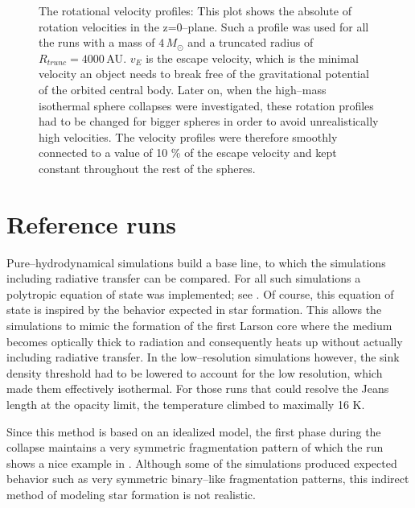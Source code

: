 \begin{figure}[!htb]
\captionsetup{justification=justified,singlelinecheck=false,width=\linewidth}
\decoRule
\caption[Rotational velocity profile]{The rotational velocity profiles: This plot shows the absolute of rotation velocities in the z=0--plane.
                                      Such a profile was used for all the runs with a mass of $4\,M_{\odot}$ and a truncated radius of $R_{trunc}=4000\,\text{AU}$.
                                      $v_{E}$ is the escape velocity, which is the minimal velocity an object needs to break free of the gravitational potential of the orbited central body.
                                      Later on, when the high--mass isothermal sphere collapses were investigated, these rotation profiles had to be changed for bigger spheres in order to avoid unrealistically high velocities.
                                      The velocity profiles were therefore smoothly connected to a value of 10 \% of the escape velocity and kept constant throughout the rest of the spheres.}
\label{fig:rot_vel}
\end{figure}
\FloatBarrier


\section{Reference runs}
\label{sec:Reference_runs}

Pure--hydrodynamical simulations build a base line, to which the simulations including radiative transfer can be compared.
For all such simulations a polytropic equation of state was implemented; see .
Of course, this equation of state is inspired by the behavior expected in star formation.
This allows the simulations to mimic the formation of the first Larson core where the medium becomes optically thick to radiation and consequently heats up without actually including radiative transfer.
In the low--resolution simulations however, the sink density threshold had to be lowered to account for the low resolution, which made them effectively isothermal.
For those runs that could resolve the Jeans length at the opacity limit, the temperature climbed to maximally 16 K.

Since this method is based on an idealized model, the first phase during the collapse maintains a very symmetric fragmentation pattern of which the  run shows a nice example in .
Although some of the simulations produced expected behavior such as very symmetric binary--like fragmentation patterns, this indirect method of modeling star formation is not realistic.


